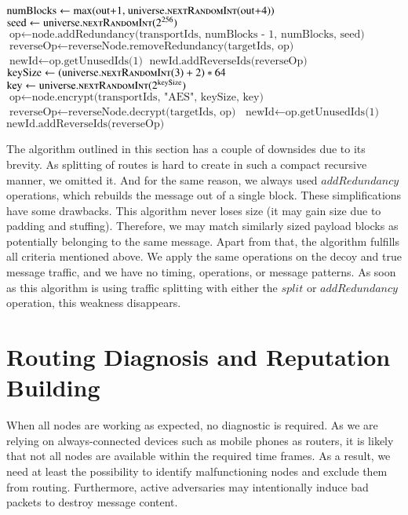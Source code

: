\begin{breakablealgorithm}
\begin{algorithmic}[1]
		\State $\text{numBlocks} \gets \text{max(out+1, universe.\Call{nextRandomInt}{out+4})}$
		\State $\text{seed} \gets \text{universe}.\Call{nextRandomInt}{2^{256}}$
		\State $\text{op} \gets \text{node.addRedundancy(transportIds, numBlocks - 1, numBlocks, seed)}$
		\State $\text{reverseOp} \gets \text{reverseNode.removeRedundancy(targetIds, op)}$
		\State $\text{newId} \gets \text{op.getUnusedIds(1)}$
		\State $\text{newId.addReverseIds(reverseOp)}$
		\EndIf	
		\Else
		\State $\text{keySize}   \gets (\text{universe}.\Call{nextRandomInt}{3}+2)*64$
		\State $\text{key}       \gets \text{universe}.\Call{nextRandomInt}{2^{\text{keySize}}}$
		\State $\text{op}        \gets \text{node.encrypt(transportIds, "AES", keySize, key)}$
		\State $\text{reverseOp} \gets \text{reverseNode.decrypt(targetIds, op)}$
		\State $\text{newId}     \gets \text{op.getUnusedIds(1)}$
		\State $\text{newId.addReverseIds(reverseOp)}$
		\EndIf	
		\EndIf
		\EndFunction\label{alg:endAssignOperation-line}
	\end{algorithmic}
\end{breakablealgorithm}

The algorithm outlined in this section has a couple of downsides due to its brevity. As splitting of routes is hard to create in such a compact recursive manner, we omitted it. And for the same reason, we always used $addRedundancy$ operations, which rebuilds the message out of a single block. These simplifications have some drawbacks. This algorithm never loses size (it may gain size due to padding and stuffing). Therefore, we may match similarly sized payload blocks as potentially belonging to the same message. Apart from that, the algorithm fulfills all criteria mentioned above. We apply the same operations on the decoy and true message traffic, and we have no timing, operations, or message patterns. As soon as this algorithm is using traffic splitting with either the $split$ or $addRedundancy$ operation, this weakness disappears.

\section{Routing Diagnosis and Reputation Building\label{sec:diagnosisOfMessagePath}}
When all nodes are working as expected, no diagnostic is required. As we are relying on always-connected devices such as mobile phones as routers, it is likely that not all nodes are available within the required time frames. As a result, we need at least the possibility to identify malfunctioning nodes and exclude them from routing. Furthermore, active adversaries may intentionally induce bad packets to destroy message content.

